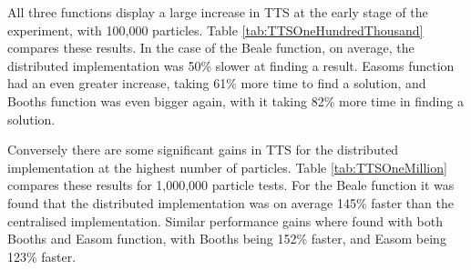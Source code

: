 \documentclass[oneside,12pt]{book}
\begin{document}
All three functions display a large increase in TTS at the early stage of the experiment, with 100,000 particles. Table \ref{tab:TTSOneHundredThousand} compares these results. In the case of the Beale function, on average, the distributed implementation was 50\% slower at finding a result. Easoms function had an even greater increase, taking 61\% more time to find a solution, and Booths function was even bigger again, with it taking 82\% more time in finding a solution. 

\begin{table}[H]
  \caption{TTS Results for 100,000 Particles}    
  \label{tab:TTSOneHundredThousand}%
\end{table}%

Conversely there are some significant gains in TTS for the distributed implementation at the highest number of particles. Table \ref{tab:TTSOneMillion} compares these results for 1,000,000 particle tests. For the Beale function it was found that the distributed implementation was on average 145\% faster than the centralised implementation. Similar performance gains where found with both Booths and Easom function, with Booths being 152\% faster, and Easom being 123\% faster. 
\end{document}
